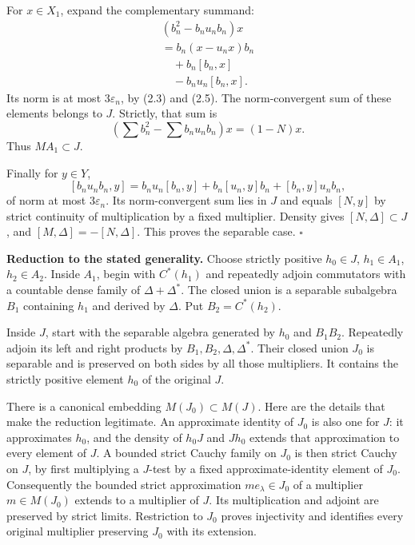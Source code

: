 \documentclass[
  11pt,
]{article}
\begin{document}
For \(x\in X_1\), expand the complementary summand: \[
\begin{gathered}
(b_n^2-b_nu_nb_n)x\\
 =b_n(x-u_nx)b_n\\
 \quad+b_n[b_n,x]\\
 \quad-b_nu_n[b_n,x].
\end{gathered}
\tag{2.11}
\] Its norm is at most \(3\varepsilon_n\), by (2.3) and (2.5). The
norm-convergent sum of these elements belongs to \(J\). Strictly, that
sum is \[
\left(\sum b_n^2-\sum b_nu_nb_n\right)x=(1-N)x.
\] Thus \(MA_1\subset J\).

Finally for \(y\in Y\), \[
[b_nu_nb_n,y]
=b_nu_n[b_n,y]+b_n[u_n,y]b_n+[b_n,y]u_nb_n,
\tag{2.12}
\] of norm at most \(3\varepsilon_n\). Its norm-convergent sum lies in
\(J\) and equals \([N,y]\) by strict continuity of multiplication by a
fixed multiplier. Density gives \([N,\Delta]\subset J\), and
\([M,\Delta]=-[N,\Delta]\). This proves the separable case. \(\square\)

\textbf{Reduction to the stated generality.} Choose strictly positive
\(h_0\in J\), \(h_1\in A_1\), \(h_2\in A_2\). Inside \(A_1\), begin with
\(C^*(h_1)\) and repeatedly adjoin commutators with a countable dense
family of \(\Delta+\Delta^*\). The closed union is a separable
subalgebra \(B_1\) containing \(h_1\) and derived by \(\Delta\). Put
\(B_2=C^*(h_2)\).

Inside \(J\), start with the separable algebra generated by \(h_0\) and
\(B_1B_2\). Repeatedly adjoin its left and right products by
\(B_1,B_2,\Delta,\Delta^*\). Their closed union \(J_0\) is separable and
is preserved on both sides by all those multipliers. It contains the
strictly positive element \(h_0\) of the original \(J\).

There is a canonical embedding \(M(J_0)\subset M(J)\). Here are the
details that make the reduction legitimate. An approximate identity of
\(J_0\) is also one for \(J\): it approximates \(h_0\), and the density
of \(h_0J\) and \(Jh_0\) extends that approximation to every element of
\(J\). A bounded strict Cauchy family on \(J_0\) is then strict Cauchy
on \(J\), by first multiplying a \(J\)-test by a fixed
approximate-identity element of \(J_0\). Consequently the bounded strict
approximation \(me_\lambda\in J_0\) of a multiplier \(m\in M(J_0)\)
extends to a multiplier of \(J\). Its multiplication and adjoint are
preserved by strict limits. Restriction to \(J_0\) proves injectivity
and identifies every original multiplier preserving \(J_0\) with its
extension.
\end{document}
